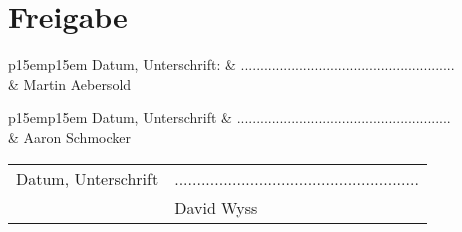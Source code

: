 \chapter{Freigabe}

	\vspace{4em}
	\begin{minipage}{\linewidth}
		\begin{tabular}{p{15em}p{15em}}
			Datum, Unterschrift: &  .......................................................\\
			& \centering Martin Aebersold\\
		\end{tabular}
		\vspace{4em}
	\end{minipage}
	\begin{minipage}{\linewidth}
		\begin{tabular}{p{15em}p{15em}}
			Datum, Unterschrift &  .......................................................\\
			& \centering Aaron Schmocker\\
		\end{tabular}
		\vspace{4em}
	\end{minipage}
	\begin{minipage}{\linewidth}
		\begin{tabular}{p{15em}p{15em}}
			Datum, Unterschrift &  .......................................................\\
			& \centering David Wyss\\
		\end{tabular}
		\vspace{4em}
	\end{minipage}

